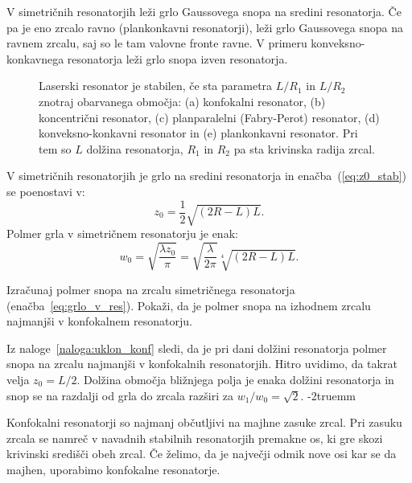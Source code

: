 V simetričnih resonatorjih leži grlo Gaussovega snopa na sredini resonatorja.
Če pa je eno zrcalo ravno (plankonkavni resonatorji), leži grlo Gaussovega snopa 
na ravnem zrcalu, saj so le tam valovne fronte ravne. V primeru konveksno-konkavnega 
resonatorja leži grlo snopa izven resonatorja. 

\begin{figure}[ht]
\centering
\def\svgwidth{95truemm} 

\caption{Laserski resonator je stabilen, 
če sta parametra $L/R_{1}$ in $L/R_{2}$ znotraj obarvanega območja:
(a) konfokalni resonator,
(b) koncentrični resonator, 
(c) planparalelni (Fabry-Perot) resonator, 
(d) konveksno-konkavni resonator 
in (e) plankonkavni resonator. Pri tem so $L$ dolžina resonatorja, $R_1$ in $R_2$ pa sta
krivinska radija zrcal.}
\label{fig:Podrocje-stabilnih-resonatorjev}
\end{figure}

V simetričnih resonatorjih je grlo na sredini resonatorja in enačba~(\ref{eq:z0_stab}) 
se poenostavi v:
\begin{equation}
z_{0}=\frac{1}{2}\sqrt{(2R-L)L}.
\label{eq:zosim}
\end{equation}
Polmer grla v simetričnem resonatorju je enak:
\begin{equation}
w_{0}=\sqrt{\frac{\lambda z_{0}}{\pi}}=\sqrt{\frac{\lambda}{2\pi}}\sqrt[4]{(2R-L)L}.
\label{eq:grlo_v_res}
\end{equation}

\begin{naloga}
\label{naloga:uklon_konf}
 Izračunaj polmer
 snopa na zrcalu simetričnega resonatorja (enačba~\ref{eq:grlo_v_res}). 
 Pokaži, da je polmer snopa na 
 izhodnem zrcalu najmanjši v konfokalnem resonatorju. 
\end{naloga} 

Iz naloge~\ref{naloga:uklon_konf} sledi, da je pri dani dolžini 
resonatorja polmer snopa na zrcalu najmanjši v konfokalnih 
resonatorjih.  Hitro uvidimo, da takrat 
velja $z_{0}=L/2$. Dolžina območja bližnjega polja je 
enaka dolžini resonatorja in snop se na razdalji od grla do zrcala razširi
za $w_1/w_0=\sqrt{2}$. 
\vglue-2truemm
\begin{remark}
Konfokalni resonatorji so najmanj občutljivi na majhne zasuke zrcal. 
Pri zasuku zrcala se namreč v navadnih stabilnih resonatorjih premakne os, ki gre skozi 
krivinski središči obeh zrcal. Če želimo, da je največji odmik nove osi kar se da
majhen, uporabimo konfokalne resonatorje. 
\end{remark}

